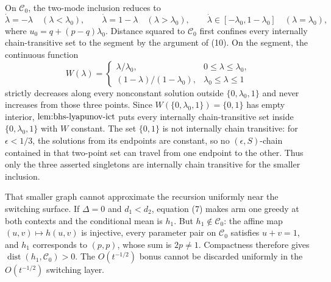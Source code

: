 On \(\mathcal C_0\), the two-mode inclusion reduces to
\[
 \dot\lambda=-\lambda\quad(\lambda<\lambda_0),\qquad
 \dot\lambda=1-\lambda\quad(\lambda>\lambda_0),\qquad
 \dot\lambda\in[-\lambda_0,1-\lambda_0]\quad(\lambda=\lambda_0), \tag{13}
\]
where \(u_0=q+(p-q)\lambda_0\). Distance squared to \(\mathcal C_0\) first confines every internally chain-transitive set to the segment by the argument of (10). On the segment, the continuous function
\[
 W(\lambda)=
 \begin{cases}
 \lambda/\lambda_0,&0\leq\lambda\leq\lambda_0,\\
 (1-\lambda)/(1-\lambda_0),&\lambda_0\leq\lambda\leq1
 \end{cases}
\]
strictly decreases along every nonconstant solution outside \(\{0,\lambda_0,1\}\) and never increases from those three points. Since \(W(\{0,\lambda_0,1\})=\{0,1\}\) has empty interior, \(\textnormal{lem:bhs-lyapunov-ict}\) puts every internally chain-transitive set inside \(\{0,\lambda_0,1\}\) with \(W\) constant. The set \(\{0,1\}\) is not internally chain transitive: for \(\epsilon<1/3\), the solutions from its endpoints are constant, so no \((\epsilon,S)\)-chain contained in that two-point set can travel from one endpoint to the other. Thus only the three asserted singletons are internally chain transitive for the smaller inclusion.

That smaller graph cannot approximate the recursion uniformly near the switching surface. If \(\Delta=0\) and \(d_1<d_2\), equation (7) makes arm one greedy at both contexts and the conditional mean is \(h_1\). But \(h_1\notin\mathcal C_0\): the affine map \((u,v)\mapsto h(u,v)\) is injective, every parameter pair on \(\mathcal C_0\) satisfies \(u+v=1\), and \(h_1\) corresponds to \((p,p)\), whose sum is \(2p\neq1\). Compactness therefore gives \(\operatorname{dist}(h_1,\mathcal C_0)>0\). The \(O(t^{-1/2})\) bonus cannot be discarded uniformly in the \(O(t^{-1/2})\) switching layer.

